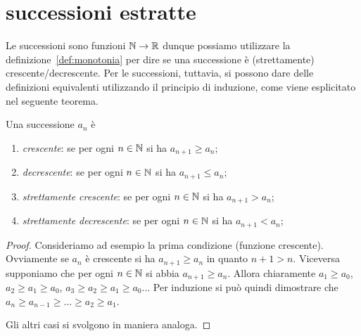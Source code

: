 \section{successioni estratte}

Le successioni sono funzioni $\mathbb N \to \mathbb R$ dunque possiamo
utilizzare la definizione~\ref{def:monotonia} per dire
se una successione è (strettamente) crescente/decrescente.
Per le successioni, tuttavia, si possono dare delle definizioni
equivalenti utilizzando il principio di induzione,
come viene esplicitato nel seguente
teorema.

\begin{theorem}
\mymark{***}
Una successione $a_n$ è
\begin{enumerate}
\item \emph{crescente}: se per ogni $n\in \mathbb N$ si ha $a_{n+1} \ge a_n$;
\item \emph{decrescente}: se per ogni $n\in \mathbb N$ si ha $a_{n+1} \le a_n$;
\item \emph{strettamente crescente}: se per ogni $n\in \mathbb N$ si ha $a_{n+1}>a_n$;
\item \emph{strettamente decrescente}: se per ogni $n\in \mathbb N$ si ha
$a_{n+1}<a_n$;
\end{enumerate}
\end{theorem}
%
\begin{proof}
  Consideriamo ad esempio la prima condizione (funzione crescente).
Ovviamente se $a_n$ è crescente si ha $a_{n+1}\ge a_n$ in quanto $n+1 > n$.
Viceversa supponiamo che per ogni $n\in \mathbb N$ si abbia $a_{n+1}\ge a_n$.  Allora
chiaramente $a_1\ge a_0$, $a_2\ge a_1 \ge a_0$, $a_3 \ge a_2 \ge a_1 \ge a_0$...
Per induzione si può quindi dimostrare che  $a_n \ge a_{n-1} \ge \dots \ge a_2
\ge a_1$.

Gli altri casi si svolgono in maniera analoga.
\end{proof}

